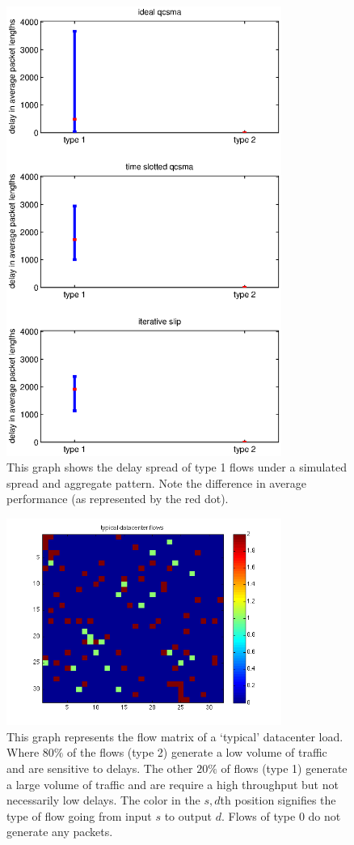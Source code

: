 \documentclass{IEEEtran}%
\begin{document}
\begin{figure}%
	 \includegraphics[width=90mm]{vs_spread.eps}
	\caption{This graph shows the delay spread of type 1 flows under a simulated spread and aggregate pattern.  Note the difference in average performance (as represented by the red dot).}
	\label{vs_spreadagg}
\end{figure}


\begin{figure}%
	 \includegraphics[width=90mm]{typ_vs_flows.png}
	\caption{This graph represents the flow matrix of a `typical' datacenter load.  Where $80\%$ of the flows (type 2) generate a low volume of traffic and are sensitive to delays.  The other $20\%$ of flows (type 1) generate a large volume of traffic and are require a high throughput but not necessarily low delays.  The color in the $s,d$th position signifies the type of flow going from input $s$ to output $d$.  Flows of type $0$ do not generate any packets.} 	
	\label{typical_flows}
\end{figure}
\end{document}
